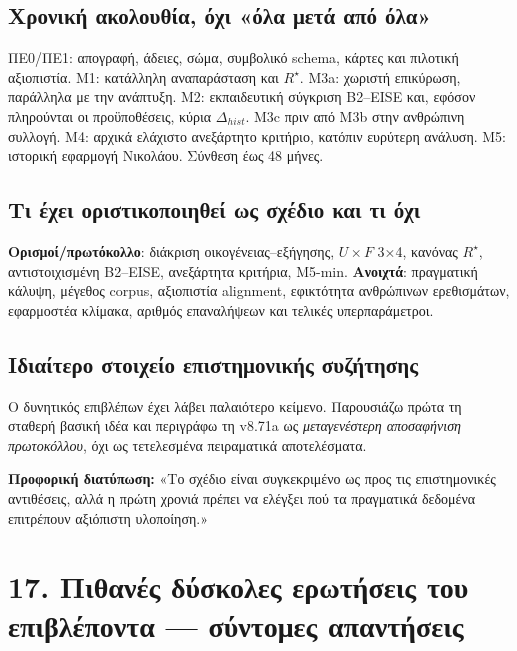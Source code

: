 \documentclass[9pt,a4paper]{extarticle}
\newcommand{\say}[1]{\begin{keybox}\textbf{Προφορική διατύπωση:} #1\end{keybox}}
\begin{document}
\subsection*{Χρονική ακολουθία, όχι «όλα μετά από όλα»}
ΠΕ0/ΠΕ1: απογραφή, άδειες, σώμα, συμβολικό schema, κάρτες και πιλοτική αξιοπιστία. M1: κατάλληλη αναπαράσταση και \(R^\star\). M3a: χωριστή επικύρωση, παράλληλα με την ανάπτυξη. M2: εκπαιδευτική σύγκριση B2--EISE και, εφόσον πληρούνται οι προϋποθέσεις, κύρια \(\Delta_{hist}\). M3c πριν από M3b στην ανθρώπινη συλλογή. M4: αρχικά ελάχιστο ανεξάρτητο κριτήριο, κατόπιν ευρύτερη ανάλυση. M5: ιστορική εφαρμογή Νικολάου. Σύνθεση έως 48 μήνες.
\subsection*{Τι έχει οριστικοποιηθεί ως σχέδιο και τι όχι}
\textbf{Ορισμοί/πρωτόκολλο}: διάκριση οικογένειας--εξήγησης, \(U\times F\) 3×4, κανόνας \(R^\star\), αντιστοιχισμένη B2--EISE, ανεξάρτητα κριτήρια, M5-min. \textbf{Ανοιχτά}: πραγματική κάλυψη, μέγεθος corpus, αξιοπιστία alignment, εφικτότητα ανθρώπινων ερεθισμάτων, εφαρμοστέα κλίμακα, αριθμός επαναλήψεων και τελικές υπερπαράμετροι.
\subsection*{Ιδιαίτερο στοιχείο επιστημονικής συζήτησης}
Ο δυνητικός επιβλέπων έχει λάβει παλαιότερο κείμενο. Παρουσιάζω πρώτα τη σταθερή βασική ιδέα και περιγράφω τη v8.71a ως \emph{μεταγενέστερη αποσαφήνιση πρωτοκόλλου}, όχι ως τετελεσμένα πειραματικά αποτελέσματα.
\say{«Το σχέδιο είναι συγκεκριμένο ως προς τις επιστημονικές αντιθέσεις, αλλά η πρώτη χρονιά πρέπει να ελέγξει πού τα πραγματικά δεδομένα επιτρέπουν αξιόπιστη υλοποίηση.»}
\newpage
\section*{17. Πιθανές δύσκολες ερωτήσεις του επιβλέποντα — σύντομες απαντήσεις}
\end{document}
